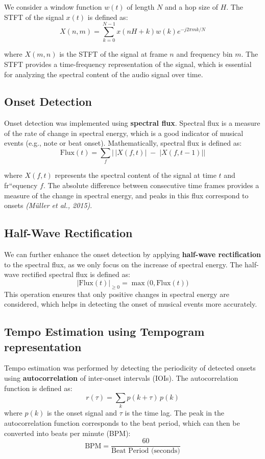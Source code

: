 \documentclass[
paper=A4,               %
pagesize=auto,          %
fontsize=12pt,          %
DIV=16,                 %
twoside=false,           %
BCOR=20mm,              %
parskip=false,          %
chapterprefix=true,     %
appendixprefix=true,    %
listof=totoc,           %
bibliography=totoc,     %
headinclude=true,       %
footinclude=false,      %
headsepline=false,       %
footsepline=false,      %
headings=small,         %
numbers=noenddot        %
] {scrbook}
\begin{document}
We consider a window function \(w(t)\) of length \(N\) and a hop size of \(H\). The STFT of the signal \(x(t)\) is defined as:
\begin{equation}
    \label{eq:stft}
    X(n, m) = \sum_{k=0}^{N-1} x(nH + k)w(k)e^{-j2\pi mk/N}
\end{equation}

where \(X(m, n)\) is the STFT of the signal at frame \(n\) and frequency bin \(m\). The STFT provides a time-frequency representation of the signal, which is essential for analyzing the spectral content of the audio signal over time.

\subsection*{Onset Detection}
Onset detection was implemented using \textbf{spectral flux}. Spectral flux is a measure of the rate of change in spectral energy, which is a good indicator of musical events (e.g., note or beat onset). Mathematically, spectral flux is defined as:
\begin{equation}
\text{Flux}(t) = \sum_{f} \bigl|\,\lvert X(f,t)\rvert \;-\; \lvert X(f,t-1)\rvert \bigr|
\end{equation}

where \(X(f,t)\) represents the spectral content of the signal at time \(t\) and fr``equency \(f\). The absolute difference between consecutive time frames provides a measure of the change in spectral energy, and peaks in this flux correspond to onsets \textit{(Müller et al., 2015)}.

\subsection*{Half-Wave Rectification}
We can further enhance the onset detection by applying \textbf{half-wave rectification} to the spectral flux, as we only focus on the increase of spectral energy. The half-wave rectified spectral flux is defined as:
\begin{equation}
     | \text{Flux}(t) |_{\ge 0} = \max\bigl(0, \text{Flux}(t)\bigr)
\end{equation}
This operation ensures that only positive changes in spectral energy are considered, which helps in detecting the onset of musical events more accurately.

\subsection*{Tempo Estimation using Tempogram representation}
Tempo estimation was performed by detecting the periodicity of detected onsets using \textbf{autocorrelation} of inter-onset intervals (IOIs). The autocorrelation function is defined as:
\begin{equation}
r(\tau) = \sum_k p(k + \tau)\,p(k)
\end{equation}
where \(p(k)\) is the onset signal and \(\tau\) is the time lag. The peak in the autocorrelation function corresponds to the beat period, which can then be converted into beats per minute (BPM):
\begin{equation}
\text{BPM} = \frac{60}{\text{Beat Period (seconds)}}
\end{equation}
\end{document}
